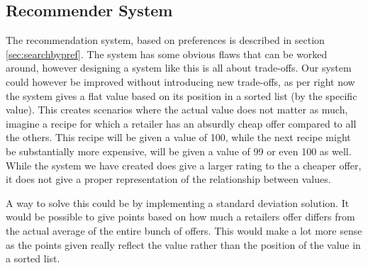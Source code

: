 \subsection{Recommender System}
\label{subsec:recommend}

The recommendation system, based on preferences is described in section \ref{sec:searchbypref}. The system has some obvious flaws that can be worked around, however designing a system like this is all about trade-offs. Our system could however be improved without introducing new trade-offs, as per right now the system gives a flat value based on its position in a sorted list (by the specific value). This creates scenarios where the actual value does not matter as much, imagine a recipe for which a retailer has an absurdly cheap offer compared to all the others. This recipe will be given a value of 100, while the next recipe might be substantially more expensive, will be given a value of 99 or even 100 as well. While the system we have created does give a larger rating to the a cheaper offer, it does not give a proper representation of the relationship between values.

A way to solve this could be by implementing a standard deviation solution. It would be possible to give points based on how much a retailers offer differs from the actual average of the entire bunch of offers. This would make a lot more sense as the points given really reflect the value rather than the position of the value in a sorted list.
